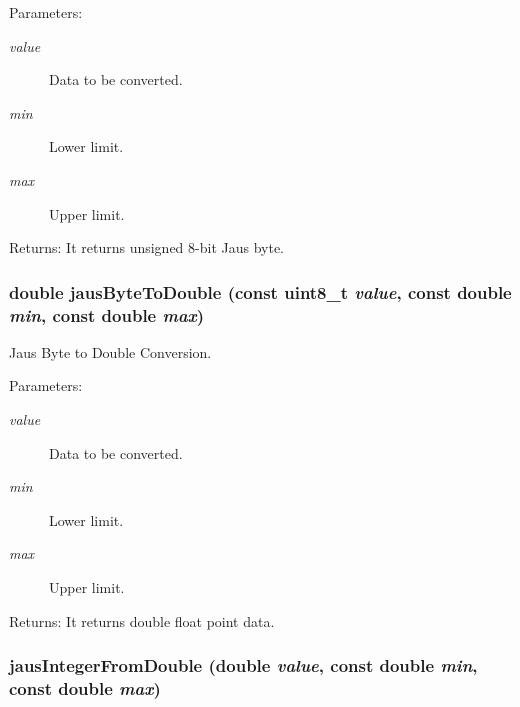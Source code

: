 \begin{Desc}
\item[Parameters:]
\begin{description}
\item[{\em value}]Data to be converted. \item[{\em min}]Lower limit. \item[{\em max}]Upper limit.\end{description}
\end{Desc}
\begin{Desc}
\item[Returns:]It returns unsigned 8-bit Jaus byte. \end{Desc}
\hypertarget{group__data__conv_gdd32c075f72b542276855114fc4ddefd}{
\subsubsection[jausByteToDouble]{\setlength{\rightskip}{0pt plus 5cm}double jausByteToDouble (const {\bf uint8\_\-t} {\em value}, \/  const double {\em min}, \/  const double {\em max})}}
\label{group__data__conv_gdd32c075f72b542276855114fc4ddefd}


Jaus Byte to Double Conversion. 

\begin{Desc}
\item[Parameters:]
\begin{description}
\item[{\em value}]Data to be converted. \item[{\em min}]Lower limit. \item[{\em max}]Upper limit.\end{description}
\end{Desc}
\begin{Desc}
\item[Returns:]It returns double float point data. \end{Desc}
\hypertarget{group__data__conv_g9202437ca54232872b3b21cf829eb255}{
\subsubsection[jausIntegerFromDouble]{ jausIntegerFromDouble (double {\em value}, \/  const double {\em min}, \/  const double {\em max})}}
\label{group__data__conv_g9202437ca54232872b3b21cf829eb255}


